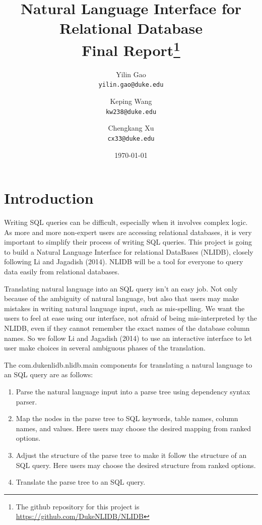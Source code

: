 \documentclass[twocolumn]{article}
\begin{document}
\title{Natural Language Interface for Relational Database\\	
	\small{Final Report}\footnote{The github repository for this project is \url{https://github.com/DukeNLIDB/NLIDB}}}

\author{Yilin Gao \\
	\small \texttt{yilin.gao@duke.edu} \and 
	Keping Wang \\
	\small \texttt{kw238@duke.edu} \and 
	Chengkang Xu \\
	\small \texttt{cx33@duke.edu} }
	
\date{\today}
\maketitle

\section{Introduction}\label{sec:introduction}

Writing SQL queries can be difficult, especially when it involves complex logic. As more and more non-expert users are accessing relational databases, it is very important to simplify their process of writing SQL queries. This project is going to build a Natural Language Interface for relational DataBases (NLIDB), closely following Li and Jagadish (2014)\cite{li2014}. NLIDB will be a tool for everyone to query data easily from relational databases.

Translating natural language into an SQL query isn't an easy job. Not only because of the ambiguity of natural language, but also that users may make mistakes in writing natural language input, such as mis-spelling. We want the users to feel at ease using our interface, not afraid of being mis-interpreted by the NLIDB, even if they cannot remember the exact names of the database column names. So we follow Li and Jagadish (2014)\cite{li2014} to use an interactive interface to let user make choices in several ambiguous phases of the translation.

The com.dukenlidb.nlidb.main components for translating a natural language to an SQL query are as follows:

\begin{enumerate}
  \item Parse the natural language input into a parse tree using dependency syntax parser.
  \item Map the nodes in the parse tree to SQL keywords, table names, column names, and values. Here users may choose the desired mapping from ranked options.
  \item Adjust the structure of the parse tree to make it follow the structure of an SQL query. Here users may choose the desired structure from ranked options.
  \item Translate the parse tree to an SQL query.
\end{enumerate}
\end{document}
